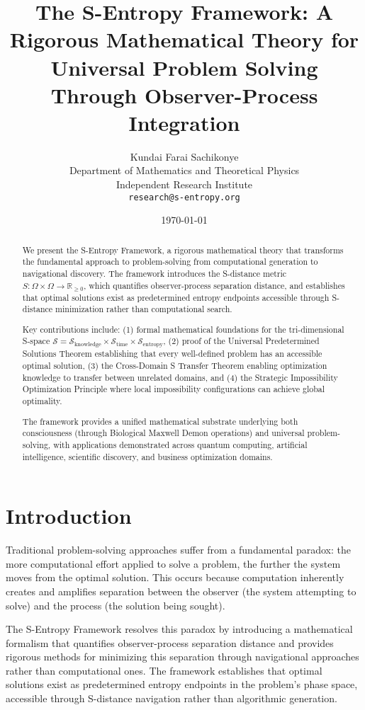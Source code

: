 \documentclass[12pt,a4paper]{article}
\title{The S-Entropy Framework: A Rigorous Mathematical Theory for Universal Problem Solving Through Observer-Process Integration}
\author{Kundai Farai Sachikonye\\
Department of Mathematics and Theoretical Physics\\
Independent Research Institute\\
\texttt{research@s-entropy.org}}
\date{\today}
\begin{document}
\maketitle

\begin{abstract}
We present the S-Entropy Framework, a rigorous mathematical theory that transforms the fundamental approach to problem-solving from computational generation to navigational discovery. The framework introduces the S-distance metric $S: \Omega \times \Omega \to \mathbb{R}_{\geq 0}$, which quantifies observer-process separation distance, and establishes that optimal solutions exist as predetermined entropy endpoints accessible through S-distance minimization rather than computational search. 

Key contributions include: (1) formal mathematical foundations for the tri-dimensional S-space $\mathcal{S} = \mathcal{S}_{\text{knowledge}} \times \mathcal{S}_{\text{time}} \times \mathcal{S}_{\text{entropy}}$, (2) proof of the Universal Predetermined Solutions Theorem establishing that every well-defined problem has an accessible optimal solution, (3) the Cross-Domain S Transfer Theorem enabling optimization knowledge to transfer between unrelated domains, and (4) the Strategic Impossibility Optimization Principle where local impossibility configurations can achieve global optimality.

The framework provides a unified mathematical substrate underlying both consciousness (through Biological Maxwell Demon operations) and universal problem-solving, with applications demonstrated across quantum computing, artificial intelligence, scientific discovery, and business optimization domains.
\end{abstract}

\section{Introduction}

Traditional problem-solving approaches suffer from a fundamental paradox: the more computational effort applied to solve a problem, the further the system moves from the optimal solution. This occurs because computation inherently creates and amplifies separation between the observer (the system attempting to solve) and the process (the solution being sought).

The S-Entropy Framework resolves this paradox by introducing a mathematical formalism that quantifies observer-process separation distance and provides rigorous methods for minimizing this separation through navigational approaches rather than computational ones. The framework establishes that optimal solutions exist as predetermined entropy endpoints in the problem's phase space, accessible through S-distance navigation rather than algorithmic generation.
\end{document}
